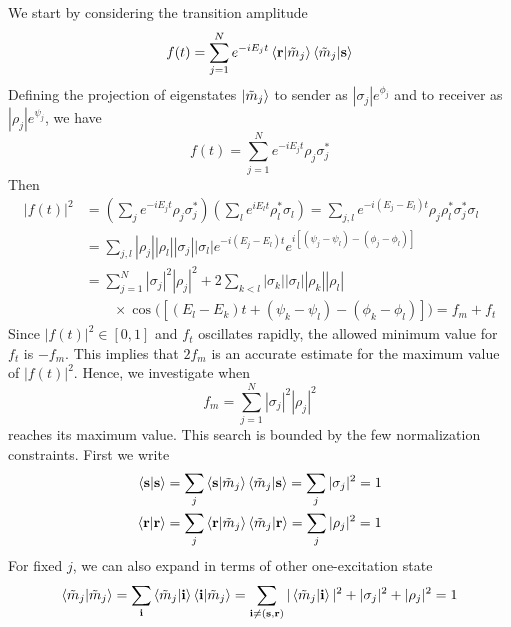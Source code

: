 \documentclass[../../../main.tex]{subfiles}
\begin{document}
We start by considering the transition amplitude
\begin{equation*}
    f(t) = \sum_{j=1}^{N} e^{-i E_j t}\braket{\mathbf{r}|\tilde{m}_j }\braket{\tilde{m}_j |\mathbf{s} }
\end{equation*}
Defining the projection of eigenstates $\ket{\tilde{m}_j}$ to sender as $|\sigma_j| e ^{\phi_j}$ and to receiver as $|\rho_j| e ^{\psi_j}$, we have
\begin{equation*}
    f(t) = \sum_{j=1}^{N} e^{-i E_j t}\rho_j \sigma_j ^*
\end{equation*}
Then
\begin{align*}
    |f(t)|^2
     & = \left(\sum_j e^{-iE_j t}\rho_j\sigma_j^*\right)\left(\sum_l e^{iE_l t}\rho_l^*\sigma_l\right)
    =  \sum_{j,l} e^{-i(E_j-E_l)t}\rho_j\rho_l^*\sigma_j^*\sigma_l                                             \\
     & = \sum_{j,l}|\rho_j||\rho_l||\sigma_j||\sigma_l|e^{-i(E_j-E_l)t} e^{i[(\psi_j-\psi_l)-(\phi_j-\phi_l)]} \\
     & = \sum_{j=1}^N |\sigma_j|^2 |\rho_j|^2 + 2\sum_{k<l} |\sigma_k||\sigma_l||\rho_k||\rho_l|               \\
     & \qquad\times\cos\big([(E_l-E_k)t + (\psi_k-\psi_l) - (\phi_k-\phi_l)]\big) = f_m + f_t
\end{align*}
Since $|f(t)|^2\in [0,1]$ and $f_t$ oscillates rapidly, the allowed minimum value for $f_t$ is $-f_m$.
This implies that $2f_m$ is an accurate estimate for the maximum value of $|f(t)|^2$.
Hence, we investigate when
\begin{equation*}
    f_m = \sum_{j=1}^N |\sigma_j|^2 |\rho_j|^2
\end{equation*}
reaches its maximum value.
This search is bounded by the few normalization constraints.
First we write
\begin{align*}
    \braket{\mathbf{s} | \mathbf{s}}
     & =  \sum_{j } \braket{\mathbf{s }  | \tilde{m}_j } \braket{\tilde{m}_j  | \mathbf{s}}
    = \sum_{j } |\sigma_j|^2 = 1                                                            \\
    \braket{\mathbf{r} | \mathbf{r}}
     & =  \sum_{j } \braket{\mathbf{r }  | \tilde{m}_j } \braket{\tilde{m}_j  | \mathbf{r}}
    = \sum_{j } |\rho_j|^2 = 1
\end{align*}
For fixed $j$, we can also expand in terms of other one-excitation state
\begin{equation*}
    \braket{\tilde{m}_j  | \tilde{m}_j }
    = \sum_{ \mathbf{i} }  \braket{\tilde{m}_j  | \mathbf{i } } \braket{\mathbf{i }  | \tilde{m}_j }
    = \sum_{\mathbf{i} \neq (\mathbf{s},\mathbf{r})}  |\braket{\tilde{m}_j  | \mathbf{i }}|^2 + |\sigma_j|^2 + |\rho_j|^2 = 1
\end{equation*}
\end{document}
